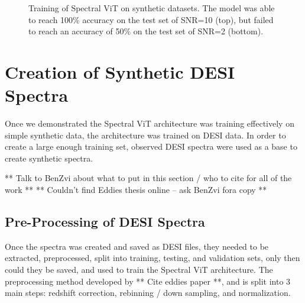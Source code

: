 \begin{figure}[h]
    \centering
    \qquad
    \caption{Training of Spectral ViT on synthetic datasets. The model was able to reach 100\% accuracy on the test set of SNR=10 (top), 
    but failed to reach an accuracy of 50\% on the test set of SNR=2 (bottom).}
\label{fig:synth_spectra_training}
\end{figure}



\section{Creation of Synthetic DESI Spectra}
\label{sec:synth_data}
Once we demonstrated the Spectral ViT architecture was training effectively on simple synthetic data,
the architecture was trained on DESI data. In order to create a large enough training 
set, observed DESI spectra were used as a base to create synthetic spectra.

** Talk to BenZvi about what to put in this section / who to cite for all of the work **
** Couldn't find Eddies thesis online -- ask BenZvi fora copy ** 

\subsection{Pre-Processing of DESI Spectra}
\label{ssec:preprocess}
Once the spectra was created and saved as DESI files, they needed to be 
extracted, preprocessed, split into training, testing, and validation sets, 
only then could they be saved, and used to train the Spectral ViT architecture.
The preprocessing method developed by ** Cite eddies paper **, and is split into 
3 main steps: redshift correction, rebinning / down sampling, and normalization. 

